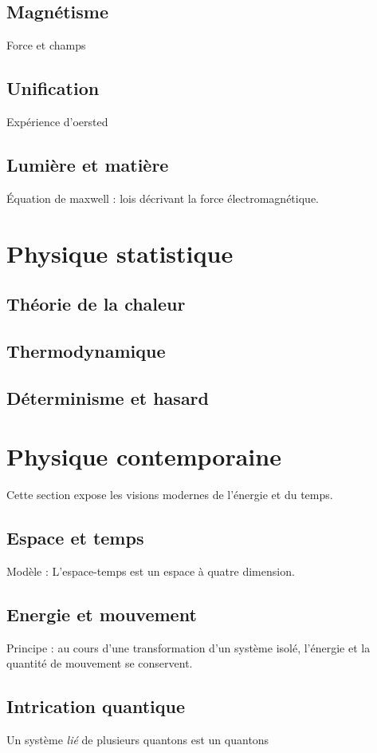     \subsection{Magnétisme}
Force et champs
    \subsection{Unification}
Expérience d'oersted

  \subsection{Lumière et matière}
Équation de maxwell : lois décrivant la force électromagnétique.

\section{Physique statistique}

  \subsection{Théorie de la chaleur}
    \subsection{Thermodynamique}
    \subsection{Déterminisme et hasard}


\section{Physique contemporaine}

Cette section expose les visions modernes de l'énergie et du temps.

  \subsection{Espace et temps}
Modèle : L'espace-temps est un espace à quatre dimension.
  \subsection{Energie et mouvement}
Principe : au cours d'une transformation d'un système isolé, l'énergie et la quantité de mouvement se conservent.
  \subsection{Intrication quantique}
Un système {\it lié} de plusieurs quantons est un quantons

